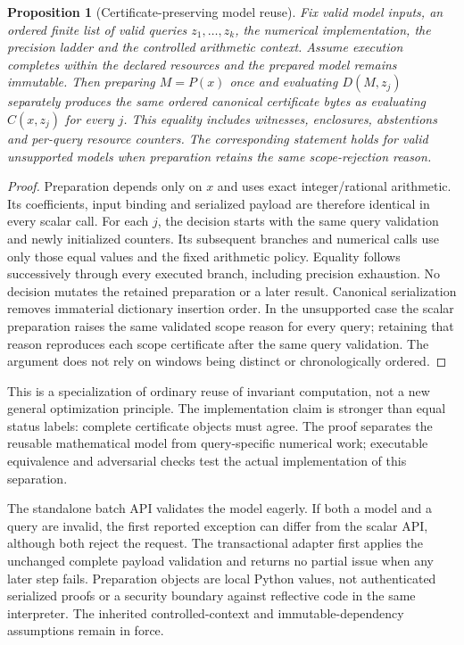 \documentclass[11pt,a4paper]{article}
\newtheorem{proposition}[theorem]{Proposition}
\theoremstyle{definition}\newtheorem{definition}[theorem]{Definition}
\begin{document}
\begin{proposition}[Certificate-preserving model reuse]\label{prop:batchpreservation}
Fix valid model inputs, an ordered finite list of valid queries $z_1,\ldots,z_k$, the numerical implementation, the precision ladder and the controlled arithmetic context. Assume execution completes within the declared resources and the prepared model remains immutable. Then preparing $M=P(x)$ once and evaluating $D(M,z_j)$ separately produces the same ordered canonical certificate bytes as evaluating $C(x,z_j)$ for every $j$. This equality includes witnesses, enclosures, abstentions and per-query resource counters. The corresponding statement holds for valid unsupported models when preparation retains the same scope-rejection reason.
\end{proposition}
\begin{proof}
Preparation depends only on $x$ and uses exact integer/rational arithmetic. Its coefficients, input binding and serialized payload are therefore identical in every scalar call. For each $j$, the decision starts with the same query validation and newly initialized counters. Its subsequent branches and numerical calls use only those equal values and the fixed arithmetic policy. Equality follows successively through every executed branch, including precision exhaustion. No decision mutates the retained preparation or a later result. Canonical serialization removes immaterial dictionary insertion order. In the unsupported case the scalar preparation raises the same validated scope reason for every query; retaining that reason reproduces each scope certificate after the same query validation. The argument does not rely on windows being distinct or chronologically ordered.
\end{proof}

This is a specialization of ordinary reuse of invariant computation, not a new general optimization principle. The implementation claim is stronger than equal status labels: complete certificate objects must agree. The proof separates the reusable mathematical model from query-specific numerical work; executable equivalence and adversarial checks test the actual implementation of this separation.

The standalone batch API validates the model eagerly. If both a model and a query are invalid, the first reported exception can differ from the scalar API, although both reject the request. The transactional adapter first applies the unchanged complete payload validation and returns no partial issue when any later step fails. Preparation objects are local Python values, not authenticated serialized proofs or a security boundary against reflective code in the same interpreter. The inherited controlled-context and immutable-dependency assumptions remain in force.
\end{document}
